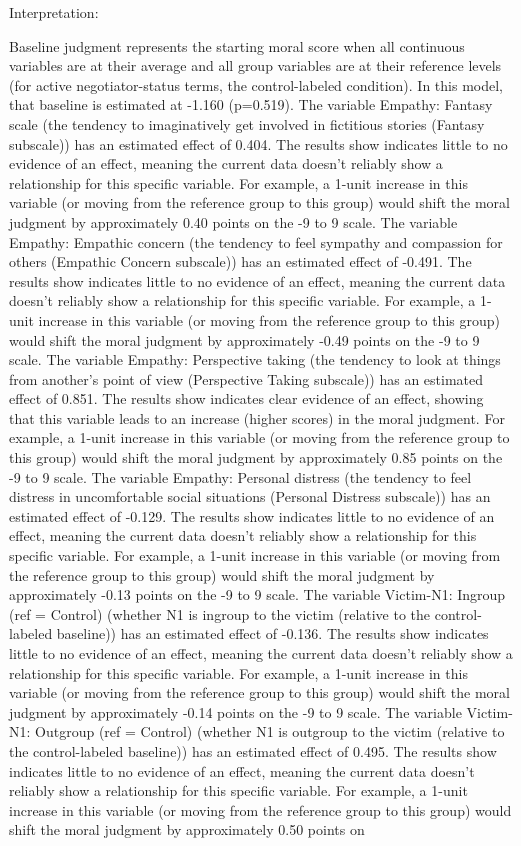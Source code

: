 \documentclass[11pt]{article}
\begin{document}
Interpretation:

Baseline judgment represents the starting moral score when all continuous variables are at their average and all group variables are at their reference levels (for active negotiator-status terms, the control-labeled condition). In this model, that baseline is estimated at -1.160 (p=0.519). The variable Empathy: Fantasy scale (the tendency to imaginatively get involved in fictitious stories (Fantasy subscale)) has an estimated effect of 0.404. The results show indicates little to no evidence of an effect, meaning the current data doesn't reliably show a relationship for this specific variable. For example, a 1-unit increase in this variable (or moving from the reference group to this group) would shift the moral judgment by approximately 0.40 points on the -9 to 9 scale. The variable Empathy: Empathic concern (the tendency to feel sympathy and compassion for others (Empathic Concern subscale)) has an estimated effect of -0.491. The results show indicates little to no evidence of an effect, meaning the current data doesn't reliably show a relationship for this specific variable. For example, a 1-unit increase in this variable (or moving from the reference group to this group) would shift the moral judgment by approximately -0.49 points on the -9 to 9 scale. The variable Empathy: Perspective taking (the tendency to look at things from another's point of view (Perspective Taking subscale)) has an estimated effect of 0.851. The results show indicates clear evidence of an effect, showing that this variable leads to an increase (higher scores) in the moral judgment. For example, a 1-unit increase in this variable (or moving from the reference group to this group) would shift the moral judgment by approximately 0.85 points on the -9 to 9 scale. The variable Empathy: Personal distress (the tendency to feel distress in uncomfortable social situations (Personal Distress subscale)) has an estimated effect of -0.129. The results show indicates little to no evidence of an effect, meaning the current data doesn't reliably show a relationship for this specific variable. For example, a 1-unit increase in this variable (or moving from the reference group to this group) would shift the moral judgment by approximately -0.13 points on the -9 to 9 scale. The variable Victim-N1: Ingroup (ref = Control) (whether N1 is ingroup to the victim (relative to the control-labeled baseline)) has an estimated effect of -0.136. The results show indicates little to no evidence of an effect, meaning the current data doesn't reliably show a relationship for this specific variable. For example, a 1-unit increase in this variable (or moving from the reference group to this group) would shift the moral judgment by approximately -0.14 points on the -9 to 9 scale. The variable Victim-N1: Outgroup (ref = Control) (whether N1 is outgroup to the victim (relative to the control-labeled baseline)) has an estimated effect of 0.495. The results show indicates little to no evidence of an effect, meaning the current data doesn't reliably show a relationship for this specific variable. For example, a 1-unit increase in this variable (or moving from the reference group to this group) would shift the moral judgment by approximately 0.50 points on 
\end{document}
